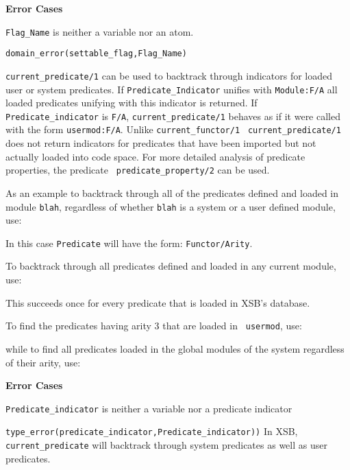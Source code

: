 \begin{description}
{\bf Error Cases}
\bi
\item 	{\tt Flag\_Name} is neither a variable nor an atom.
\bi
\item 	{\tt domain\_error(settable\_flag,Flag\_Name)}
\ei
\ei

%
{\tt current\_predicate/1} can be used to backtrack through indicators
for loaded user or system predicates.  If {\tt Predicate\_Indicator}
unifies with {\tt Module:F/A} all loaded predicates unifying with this
indicator is returned.  If {\tt Predicate\_indicator} is {\tt F/A},
{\tt current\_predicate/1} behaves as if it were called with the form
{\tt usermod:F/A}.  Unlike {\tt current\_functor/1} {\tt
current\_predicate/1} does not return indicators for predicates that
have been imported but not actually loaded into code space.  For more
detailed analysis of predicate properties, the predicate {\tt
predicate\_property/2} can be used.

As an example to backtrack through all of the predicates defined and loaded in
module {\tt blah}, regardless of whether {\tt blah} is a system or a
user defined module, use:


    In this case {\tt Predicate} will have the form: {\tt Functor/Arity}.

    To backtrack through all predicates defined and loaded in any current 
    module, use:


    This succeeds once for every predicate that is loaded in XSB's
    database.

    To find the predicates having arity 3 that are loaded in {\tt
    usermod}, use:


    while to find all predicates loaded in the global modules of the system
    regardless of their arity, use:

%
{\bf Error Cases}
\bi
\item 	{\tt Predicate\_indicator} is neither a variable nor a predicate indicator
\bi
\item 	{\tt type\_error(predicate\_indicator,Predicate\_indicator))}
\ei
\ei
%
\compatability
%
In XSB, {\tt current\_predicate} will backtrack through system
predicates as well as user predicates.



\end{description}
